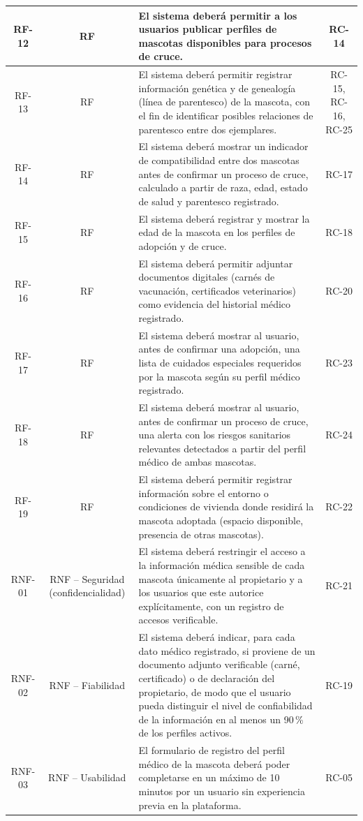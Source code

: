 \begin{longtable}{|c|c|p{9.5cm}|c|}
	RF-12 & RF & El sistema deberá permitir a los usuarios publicar perfiles de mascotas disponibles para procesos de cruce. & RC-14 \\ \hline
	RF-13 & RF & El sistema deberá permitir registrar información genética y de genealogía (línea de parentesco) de la mascota, con el fin de identificar posibles relaciones de parentesco entre dos ejemplares. & RC-15, RC-16, RC-25 \\ \hline
	RF-14 & RF & El sistema deberá mostrar un indicador de compatibilidad entre dos mascotas antes de confirmar un proceso de cruce, calculado a partir de raza, edad, estado de salud y parentesco registrado. & RC-17 \\ \hline
	RF-15 & RF & El sistema deberá registrar y mostrar la edad de la mascota en los perfiles de adopción y de cruce. & RC-18 \\ \hline
	RF-16 & RF & El sistema deberá permitir adjuntar documentos digitales (carnés de vacunación, certificados veterinarios) como evidencia del historial médico registrado. & RC-20 \\ \hline
	RF-17 & RF & El sistema deberá mostrar al usuario, antes de confirmar una adopción, una lista de cuidados especiales requeridos por la mascota según su perfil médico registrado. & RC-23 \\ \hline
	RF-18 & RF & El sistema deberá mostrar al usuario, antes de confirmar un proceso de cruce, una alerta con los riesgos sanitarios relevantes detectados a partir del perfil médico de ambas mascotas. & RC-24 \\ \hline
	RF-19 & RF & El sistema deberá permitir registrar información sobre el entorno o condiciones de vivienda donde residirá la mascota adoptada (espacio disponible, presencia de otras mascotas). & RC-22 \\ \hline
	RNF-01 & RNF -- Seguridad (confidencialidad) & El sistema deberá restringir el acceso a la información médica sensible de cada mascota únicamente al propietario y a los usuarios que este autorice explícitamente, con un registro de accesos verificable. & RC-21 \\ \hline
	RNF-02 & RNF -- Fiabilidad & El sistema deberá indicar, para cada dato médico registrado, si proviene de un documento adjunto verificable (carné, certificado) o de declaración del propietario, de modo que el usuario pueda distinguir el nivel de confiabilidad de la información en al menos un 90\,\% de los perfiles activos. & RC-19 \\ \hline
	RNF-03 & RNF -- Usabilidad & El formulario de registro del perfil médico de la mascota deberá poder completarse en un máximo de 10 minutos por un usuario sin experiencia previa en la plataforma. & RC-05 \\ \hline
	\end{longtable}

